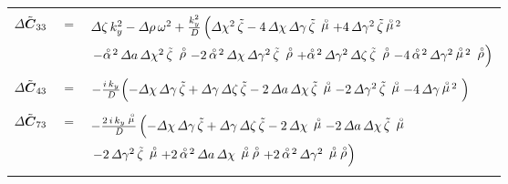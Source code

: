 \begin{table}
\begin{tabular*}{136mm}{ccl}\hline\hline
&&\\

${{\mit \Delta} \tilde{\bmi C}}_{33}$&=&${\mit \Delta} \zeta\,{k_{y}^2}- 
{\mit \Delta} \rho\,{\omega^2}+{{k_{y}^2} \over {\it D}}\left(
       {{\mit \Delta}\chi^2}\,{\tilde{\zeta}} - 
       4\,{\mit \Delta}\chi\,{\mit \Delta} \gamma\,{\tilde{\zeta}}\,\rf{\mu} + 
       4\,{{\mit \Delta} \gamma^2}\,{\tilde{\zeta}}\,{\rf{\mu}\!{}^{2}}  
        \right.$\\
&&      $  \left. -{\rf{\alpha}\!{}^2}\,{\mit \Delta}a\,{{\mit \Delta}\chi^2}\,{\tilde{\zeta}}\,
        \rf{\rho} -2\,{\rf{\alpha}\!{}^2}\,{\mit \Delta}\chi\,{{\mit \Delta} \gamma^2}\,{\tilde{\zeta}}\,
        \rf{\rho} + 
       {\rf{\alpha}\!{}^2}\,{{\mit \Delta} \gamma^2}\,
       {\mit \Delta} \zeta\,{\tilde{\zeta}}\,
        \rf{\rho} - 4\,{\rf{\alpha}\!{}^2}\,{{\mit \Delta} \gamma^2}\,
        {\rf{\mu}\!{}^{2}}\,\rf{\rho}\right)$\\

&&\\
       
${{\mit \Delta} \tilde{\bmi C}}_{43}$&$=$& $- {i\,k_{y}\over {\it D}} 
{\left( -{\mit \Delta}\chi\,{\mit \Delta} \gamma\,{\tilde{\zeta}}   + 
         {\mit \Delta} \gamma\,{\mit \Delta} \zeta\,{\tilde{\zeta}} - 
         2\,{\mit \Delta}a\,{\mit \Delta}\chi\,{\tilde{\zeta}}\,\rf{\mu} - 
         2\,{{\mit \Delta} \gamma^2}\,{\tilde{\zeta}}\,\rf{\mu} - 4\,{\mit \Delta} \gamma\,{\rf{\mu}\!{}^{2}} \
         \right) }$\\

&&\\


${{\mit \Delta} \tilde{\bmi C}}_{73}$&$=$& $-{2\,i\,k_{y}\,\rf{\mu} \over  {\it D}}
\left(
 -{\mit \Delta}\chi\,{\mit \Delta} \gamma\,{\tilde{\zeta}} 
      + {\mit \Delta} \gamma\,{\mit \Delta} \zeta\,{\tilde{\zeta}} - 2\,{\mit \Delta}\chi\,\rf{\mu} 
      -  2\,{\mit \Delta}a\,{\mit \Delta}\chi\,{\tilde{\zeta}}\,\rf{\mu}  
      \right.$\\
&&        $\left.- 2\,{{\mit \Delta} \gamma^2}\,{\tilde{\zeta}}\,\rf{\mu} + 
         2\,{\rf{\alpha}\!{}^2}\,{\mit \Delta}a\,{\mit \Delta}\chi\,\rf{\mu}\,\rf{\rho} + 
         2\,{\rf{\alpha}\!{}^2}\,{{\mit \Delta} 
         \gamma^2}\,\rf{\mu}\,\rf{\rho} \right) $\\

&&\\


\end{tabular*}
\end{table}
